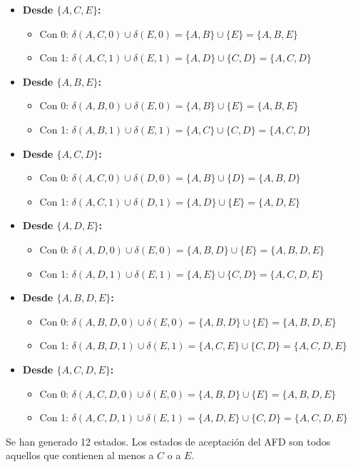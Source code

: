 \documentclass[12pt]{article}
\begin{document}
\begin{itemize}
\begin{itemize}
    \end{itemize}
    \item \textbf{Desde $\{A, C, E\}$:}
    \begin{itemize}
        \item Con 0: $\delta(A,C, 0) \cup \delta(E, 0) = \{A, B\} \cup \{E\} = \{A, B, E\}$
        \item Con 1: $\delta(A,C, 1) \cup \delta(E, 1) = \{A, D\} \cup \{C, D\} = \{A, C, D\}$
    \end{itemize}
    \item \textbf{Desde $\{A, B, E\}$:}
    \begin{itemize}
        \item Con 0: $\delta(A,B, 0) \cup \delta(E, 0) = \{A, B\} \cup \{E\} = \{A, B, E\}$
        \item Con 1: $\delta(A,B, 1) \cup \delta(E, 1) = \{A, C\} \cup \{C, D\} = \{A, C, D\}$
    \end{itemize}
    \item \textbf{Desde $\{A, C, D\}$:}
    \begin{itemize}
        \item Con 0: $\delta(A,C, 0) \cup \delta(D, 0) = \{A, B\} \cup \{D\} = \{A, B, D\}$
        \item Con 1: $\delta(A,C, 1) \cup \delta(D, 1) = \{A, D\} \cup \{E\} = \{A, D, E\}$
    \end{itemize}
    \item \textbf{Desde $\{A, D, E\}$:}
    \begin{itemize}
        \item Con 0: $\delta(A,D, 0) \cup \delta(E, 0) = \{A, B, D\} \cup \{E\} = \{A, B, D, E\}$
        \item Con 1: $\delta(A,D, 1) \cup \delta(E, 1) = \{A, E\} \cup \{C, D\} = \{A, C, D, E\}$
    \end{itemize}
    \item \textbf{Desde $\{A, B, D, E\}$:}
    \begin{itemize}
        \item Con 0: $\delta(A,B,D, 0) \cup \delta(E, 0) = \{A, B, D\} \cup \{E\} = \{A, B, D, E\}$
        \item Con 1: $\delta(A,B,D, 1) \cup \delta(E, 1) = \{A, C, E\} \cup \{C, D\} = \{A, C, D, E\}$
    \end{itemize}
    \item \textbf{Desde $\{A, C, D, E\}$:}
    \begin{itemize}
        \item Con 0: $\delta(A,C,D, 0) \cup \delta(E, 0) = \{A, B, D\} \cup \{E\} = \{A, B, D, E\}$
        \item Con 1: $\delta(A,C,D, 1) \cup \delta(E, 1) = \{A, D, E\} \cup \{C, D\} = \{A, C, D, E\}$
    \end{itemize}
\end{itemize}
Se han generado 12 estados. Los estados de aceptación del AFD son todos aquellos que contienen al menos a $C$ o a $E$.
\end{document}
